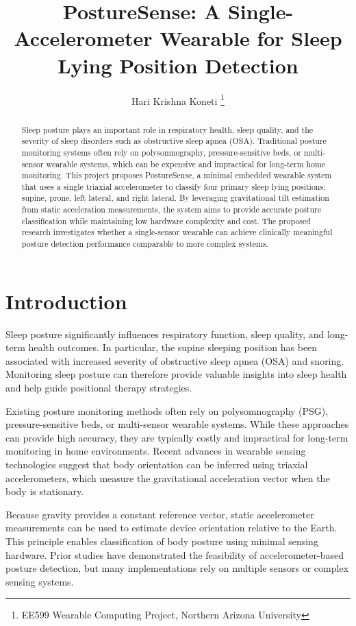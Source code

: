 \documentclass[10pt,journal]{IEEEtran}
\title{PostureSense: A Single-Accelerometer Wearable for Sleep Lying Position Detection}
\author{Hari Krishna Koneti
\thanks{EE599 Wearable Computing Project, Northern Arizona University}
}
\begin{document}
\maketitle

\begin{abstract}
Sleep posture plays an important role in respiratory health, sleep quality, and the severity of sleep disorders such as obstructive sleep apnea (OSA). Traditional posture monitoring systems often rely on polysomnography, pressure-sensitive beds, or multi-sensor wearable systems, which can be expensive and impractical for long-term home monitoring. This project proposes PostureSense, a minimal embedded wearable system that uses a single triaxial accelerometer to classify four primary sleep lying positions: supine, prone, left lateral, and right lateral. By leveraging gravitational tilt estimation from static acceleration measurements, the system aims to provide accurate posture classification while maintaining low hardware complexity and cost. The proposed research investigates whether a single-sensor wearable can achieve clinically meaningful posture detection performance comparable to more complex systems.
\end{abstract}

\section{Introduction}

Sleep posture significantly influences respiratory function, sleep quality, and long-term health outcomes. In particular, the supine sleeping position has been associated with increased severity of obstructive sleep apnea (OSA) and snoring. Monitoring sleep posture can therefore provide valuable insights into sleep health and help guide positional therapy strategies.

Existing posture monitoring methods often rely on polysomnography (PSG), pressure-sensitive beds, or multi-sensor wearable systems. While these approaches can provide high accuracy, they are typically costly and impractical for long-term monitoring in home environments. Recent advances in wearable sensing technologies suggest that body orientation can be inferred using triaxial accelerometers, which measure the gravitational acceleration vector when the body is stationary.

Because gravity provides a constant reference vector, static accelerometer measurements can be used to estimate device orientation relative to the Earth. This principle enables classification of body posture using minimal sensing hardware. Prior studies have demonstrated the feasibility of accelerometer-based posture detection, but many implementations rely on multiple sensors or complex sensing systems.
\end{document}
